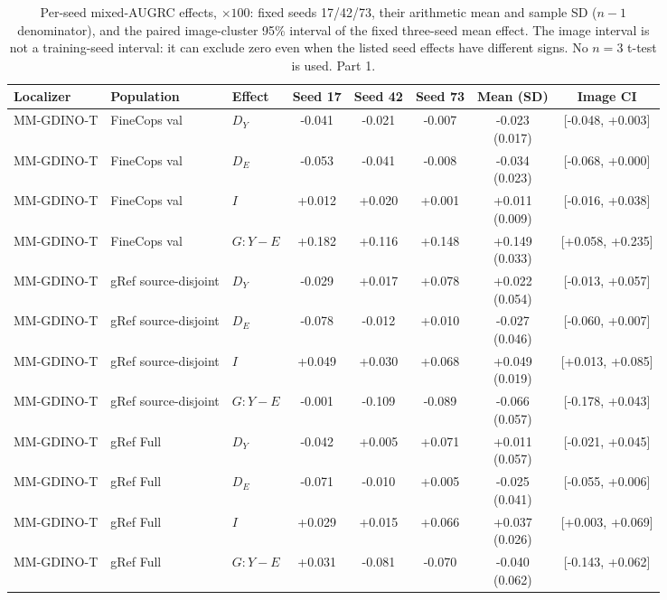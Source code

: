 \begin{table}[t]
\centering\footnotesize
\setlength{\tabcolsep}{3pt}
\renewcommand{\arraystretch}{1.15}
\caption{Per-seed mixed-AUGRC effects, $\times100$: fixed seeds 17/42/73, their arithmetic mean and sample SD ($n-1$ denominator), and the paired image-cluster 95\% interval of the fixed three-seed mean effect. The image interval is not a training-seed interval: it can exclude zero even when the listed seed effects have different signs. No $n=3$ t-test is used. Part 1.}\label{tab:supp_v6_seed_effects_1}
\begin{tabular}{@{}lllccccc@{}}\toprule
Localizer & Population & Effect & Seed 17 & Seed 42 & Seed 73 & Mean (SD) & Image CI\\\midrule
MM-GDINO-T & FineCops val & $D_Y$ & -0.041 & -0.021 & -0.007 & \shortstack{-0.023\\(0.017)} & [-0.048, +0.003]\\
MM-GDINO-T & FineCops val & $D_E$ & -0.053 & -0.041 & -0.008 & \shortstack{-0.034\\(0.023)} & [-0.068, +0.000]\\
MM-GDINO-T & FineCops val & $I$ & +0.012 & +0.020 & +0.001 & \shortstack{+0.011\\(0.009)} & [-0.016, +0.038]\\
MM-GDINO-T & FineCops val & $G:Y-E$ & +0.182 & +0.116 & +0.148 & \shortstack{+0.149\\(0.033)} & [+0.058, +0.235]\\
MM-GDINO-T & gRef source-disjoint & $D_Y$ & -0.029 & +0.017 & +0.078 & \shortstack{+0.022\\(0.054)} & [-0.013, +0.057]\\
MM-GDINO-T & gRef source-disjoint & $D_E$ & -0.078 & -0.012 & +0.010 & \shortstack{-0.027\\(0.046)} & [-0.060, +0.007]\\
MM-GDINO-T & gRef source-disjoint & $I$ & +0.049 & +0.030 & +0.068 & \shortstack{+0.049\\(0.019)} & [+0.013, +0.085]\\
MM-GDINO-T & gRef source-disjoint & $G:Y-E$ & -0.001 & -0.109 & -0.089 & \shortstack{-0.066\\(0.057)} & [-0.178, +0.043]\\
MM-GDINO-T & gRef Full & $D_Y$ & -0.042 & +0.005 & +0.071 & \shortstack{+0.011\\(0.057)} & [-0.021, +0.045]\\
MM-GDINO-T & gRef Full & $D_E$ & -0.071 & -0.010 & +0.005 & \shortstack{-0.025\\(0.041)} & [-0.055, +0.006]\\
MM-GDINO-T & gRef Full & $I$ & +0.029 & +0.015 & +0.066 & \shortstack{+0.037\\(0.026)} & [+0.003, +0.069]\\
MM-GDINO-T & gRef Full & $G:Y-E$ & +0.031 & -0.081 & -0.070 & \shortstack{-0.040\\(0.062)} & [-0.143, +0.062]\\
\bottomrule\end{tabular}
\end{table}

